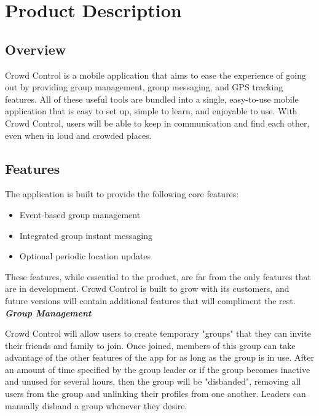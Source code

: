 \section{Product Description}

\subsection{Overview}

Crowd Control is a mobile application that aims to ease the experience of going out by providing group
management, group messaging, and GPS tracking features. All of these useful tools are bundled into a
single, easy-to-use mobile application that is easy to set up, simple to learn, and enjoyable to use. With
Crowd Control, users will be able to keep in communication and find each other, even when in loud and
crowded places.

\subsection{Features}

The application is built to provide the following core features:

\begin{itemize}
\item Event-based group management
\item Integrated group instant messaging
\item Optional periodic location updates
\end{itemize}

These features, while essential to the product, are far from the only features that are in development.
Crowd Control is built to grow with its customers, and future versions will contain additional features
that will compliment the rest.\\

\noindent
\textit{\textbf{Group Management}}

Crowd Control will allow users to create temporary "groups" that they can invite their friends and family
to join. Once joined, members of this group can take advantage of the other features of the app for as
long as the group is in use. After an amount of time specified by the group leader or if the group
becomes inactive and unused for several hours, then the group will be "disbanded", removing all
users from the group and unlinking their profiles from one another. Leaders can manually disband a
group whenever they desire.

